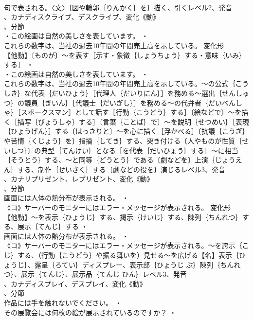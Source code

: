 \documentclass[8pt]{extreport}
\begin{document}
\begin{CJK}{UTF8}{min}
\\	句で表される。〈文〉〔図や輪郭｛りんかく｝を〕描く、引くレベル2、発音
\\	、カナディスクライブ、デスクライブ、変化《動》
\\	、分節
\\	・この絵画は自然の美しさを表しています。 ・
\\	これらの数字は、当社の過去10年間の年間売上高を示している。	変化形 
\\	【他動】〔ものが〕～を表す［示す・象徴｛しょうちょう｝する・意味｛いみ｝する］ ・
\\	・この絵画は自然の美しさを表しています。 ・
\\	これらの数字は、当社の過去10年間の年間売上高を示している。～の公式｛こうしき｝な代表｛だいひょう｝［代理人｛だいりにん｝］を務める～選出｛せんしゅつ｝の議員｛ぎいん｝［代議士｛だいぎし｝］を務める～の代弁者｛だいべんしゃ｝［スポークスマン］として話す［行動｛こうどう｝する］〔絵などで〕～を描く［描写｛びょうしゃ｝する］〔言葉｛ことば｝で〕～を説明｛せつめい｝［表現｛ひょうげん｝］する〔はっきりと〕～を心に描く［浮かべる］〔抗議｛こうぎ｝や苦情｛くじょう｝を〕指摘｛してき｝する、突き付ける〔人やものが性質｛せいしつ｝〕の典型｛てんけい｝となる［を代表｛だいひょう｝する］～に相当｛そうとう｝する、～と同等｛どうとう｝である〔劇などを〕上演｛じょうえん｝する、制作｛せいさく｝する〔劇などの役を〕演じるレベル3、発音
\\	、カナリプリゼント、レプリゼント、変化《動》
\\	、分節
\\	画面には人体の熱分布が表示される。 ・
\\	《コ》サーバーのモニターにはエラー・メッセージが表示される。	変化形 
\\	【他動】～を表示｛ひょうじ｝する、掲示｛けいじ｝する、陳列｛ちんれつ｝する、展示｛てんじ｝する ・
\\	画面には人体の熱分布が表示される。 ・
\\	《コ》サーバーのモニターにはエラー・メッセージが表示される。～を誇示｛こじ｝する、（行動｛こうどう｝や振る舞いを）見せる～を広げる【名】表示｛ひょうじ｝、露呈｛ろてい｝ディスプレー、表示部｛ひょうじ ぶ｝陳列｛ちんれつ｝、展示｛てんじ｝、展示品｛てんじ ひん｝レベル3、発音
\\	、カナディスプレイ、デスプレイ、変化《動》
\\	、分節
\\	作品には手を触れないでください。 ・
\\	その展覧会には何枚の絵が展示されているのですか？ ・

\end{CJK}
\end{document}
